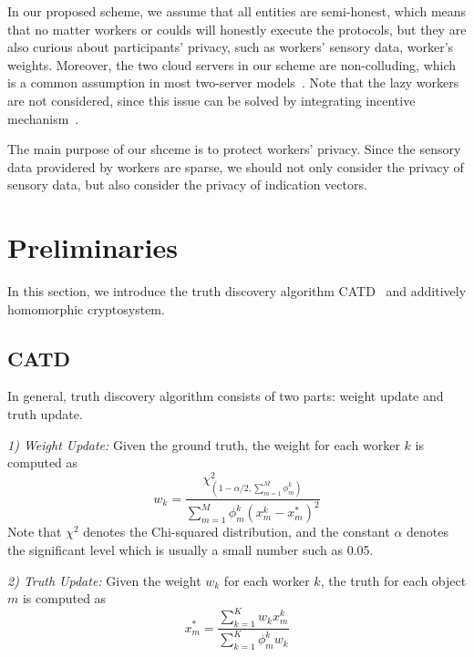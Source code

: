 \documentclass[conference]{IEEEtran}
\begin{document}
In our proposed scheme, we assume that all entities are semi-honest, which means that no matter workers or coulds will honestly execute the protocols, but they are also curious about participants' privacy, such as workers' sensory data, worker's weights.
Moreover, the two cloud servers in our scheme are non-colluding, which is a common assumption in most two-server models~\cite{zhang_lptd_2019,zhang_reliable_2019}.
Note that the lazy workers are not considered, since this issue can be solved by integrating incentive mechanism~\cite{xue_inpptd_2020}.

The main purpose of our shceme is to protect workers' privacy.
Since the sensory data providered by workers are sparse, we should not only consider the privacy of sensory data, but also consider the privacy of indication vectors.

\section{Preliminaries}\label{sec4}
In this section, we introduce the truth discovery algorithm CATD~\cite{li_confidence-aware_2014} and additively homomorphic cryptosystem.

\subsection{CATD}
In general, truth discovery algorithm consists of two parts: weight update and truth update.

\textit{1) Weight Update:} Given the ground truth, the weight for each worker $k$ is computed as
\begin{equation}
w_k = \frac{\chi^2_{(1-\alpha/2,\sum_{m=1}^M \phi_m^k)}}{\sum_{m=1}^M \phi_m^k(x_m^k - x_m^*)^2}
\end{equation}
Note that $\chi^2$ denotes the Chi-squared distribution, and the constant $\alpha$ denotes the significant level which is usually a small number such as 0.05.

\textit{2) Truth Update:} Given the weight $w_k$ for each worker $k$, the truth for each object $m$ is computed as
\begin{equation}
x_m^* = \frac{\sum_{k=1}^K w_k x_m^k}{\sum_{k=1}^K \phi_m^k w_k }
\end{equation}
\end{document}
